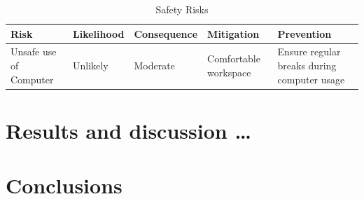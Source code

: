 \documentclass[12pt,openany,a4paper]{book}
\newcommand{\tab}[1]  {Table~\ref{#1}}		%
\begin{document}
\begin{table}[h]
    \centering
    \begin{tabular}{ |p{2cm}|p{2.1cm}|p{2.6cm}|p{4cm}|p{4cm}| }
        \hline
        \textbf{Risk} & \textbf{Likelihood} & \textbf{Consequence} & \textbf{Mitigation} & \textbf{Prevention}\\
        \hline
        Unsafe use of Computer & Unlikely & Moderate & Comfortable workspace & Ensure regular breaks during computer usage\\
        \hline
    \end{tabular}
    \caption{Safety Risks}
    \label{safety-risk-table}
\end{table}
\chapter{Results and discussion \ldots}
% 
% 
% 
% 
\chapter{Conclusions}
% 
% 

\appendix


\newpage
{}
\mbox{}
\newpage

\end{document}
